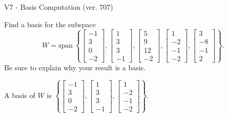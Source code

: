 \begin{exercise}
  \begin{exerciseTitle}V7 - Basis Computation (ver. 707)\end{exerciseTitle}
  \begin{exerciseStatement}
    Find a basis for the subspace 
\[W=\mathrm{span}\ \left\{\left[\begin{array}{r}
-1 \\
3 \\
0 \\
-2
\end{array}\right] , \left[\begin{array}{r}
1 \\
3 \\
3 \\
-1
\end{array}\right] , \left[\begin{array}{r}
5 \\
9 \\
12 \\
-2
\end{array}\right] , \left[\begin{array}{r}
1 \\
-2 \\
-1 \\
-2
\end{array}\right] , \left[\begin{array}{r}
3 \\
-8 \\
-1 \\
2
\end{array}\right]\right\}.\]
 Be sure to explain why your result is a basis.


  \end{exerciseStatement}
  \begin{exerciseAnswer}
   A basis of \(W\) is  \(\left\{\left[\begin{array}{r}
-1 \\
3 \\
0 \\
-2
\end{array}\right] , \left[\begin{array}{r}
1 \\
3 \\
3 \\
-1
\end{array}\right] , \left[\begin{array}{r}
1 \\
-2 \\
-1 \\
-2
\end{array}\right]\right\}\).
  


  \end{exerciseAnswer}
\end{exercise}